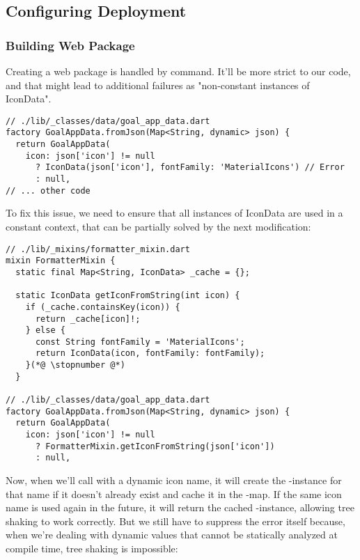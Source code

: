 
\subsection{Configuring Deployment}


\subsubsection{Building Web Package} \label{deploy-web}

Creating a web package is handled by  command. It'll be more strict to our code, and 
that might lead to additional failures as "non-constant instances of IconData".

\begin{lstlisting}
// ./lib/_classes/data/goal_app_data.dart
factory GoalAppData.fromJson(Map<String, dynamic> json) {
  return GoalAppData(
    icon: json['icon'] != null
      ? IconData(json['icon'], fontFamily: 'MaterialIcons') // Error
      : null,
// ... other code
\end{lstlisting}

\noindent To fix this issue, we need to ensure that all instances of IconData are used in a constant context, that can 
be partially solved by the next modification:

\begin{lstlisting}
// ./lib/_mixins/formatter_mixin.dart
mixin FormatterMixin {
  static final Map<String, IconData> _cache = {};

  static IconData getIconFromString(int icon) {
    if (_cache.containsKey(icon)) {
      return _cache[icon]!;
    } else {
      const String fontFamily = 'MaterialIcons';
      return IconData(icon, fontFamily: fontFamily);
    }(*@ \stopnumber @*)
  }

// ./lib/_classes/data/goal_app_data.dart
factory GoalAppData.fromJson(Map<String, dynamic> json) {
  return GoalAppData(
    icon: json['icon'] != null
      ? FormatterMixin.getIconFromString(json['icon'])
      : null,
\end{lstlisting}

\noindent Now, when we'll call  with a dynamic icon name, it will create the -instance 
for that name if it doesn't already exist and cache it in the -map. If the same icon name is used again in 
the future, it will return the cached -instance, allowing tree shaking to work correctly. But we still have 
to suppress the error itself because, when we're dealing with dynamic values that cannot be statically analyzed at 
compile time, tree shaking is impossible:

